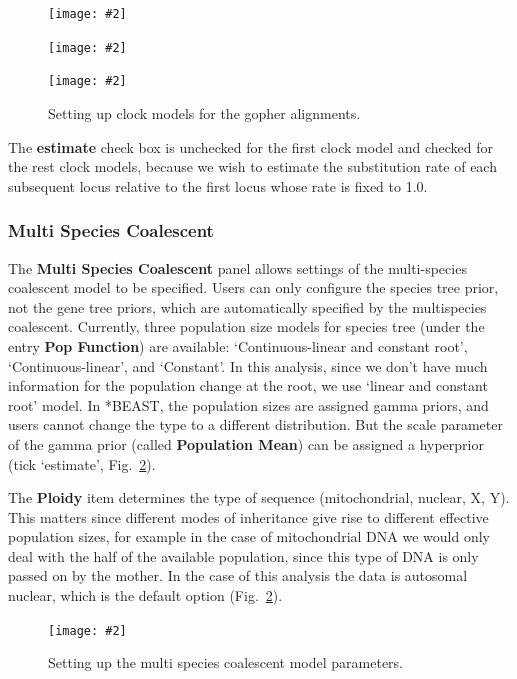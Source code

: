 \documentclass{article}
\newcommand{\includeimage}[2][]{%
\texttt{[image: \#2]}
}
\begin{document}
\begin{figure}[h]
\centering
\includeimage[scale=0.3,clip=true,trim=0 550 0 0]{figures/BEAUti_ClockModel1}
\centering
\includeimage[scale=0.3,clip=true,trim=0 550 0 0]{figures/BEAUti_ClockModel2}
\centering
\includeimage[scale=0.3,clip=true,trim=0 550 0 0]{figures/BEAUti_ClockModel3}
\caption{\label{fig.clockmodel} Setting up clock models for the gopher alignments.}
\end{figure}

The {\bf estimate} check box is unchecked for the first clock model and checked for the rest clock models, because we wish to estimate the substitution rate of each subsequent locus relative to the first locus whose rate is fixed to 1.0.

\subsubsection{Multi Species Coalescent}

The {\bf Multi Species Coalescent} panel allows settings of the multi-species coalescent model to be specified. Users can only configure the species tree prior, not the gene tree priors, which are automatically specified by the multispecies coalescent.
Currently, three population size models for species tree (under the entry {\bf Pop Function}) are available: `Continuous-linear and constant root', `Continuous-linear', and `Constant'. In this analysis, since we don't have much information for the population change at the root, we use `linear and constant root' model.
In *BEAST, the population sizes are assigned gamma priors, and users cannot change the type to a different distribution. But the scale parameter of the gamma prior (called {\bf Population Mean}) can be assigned a hyperprior (tick `estimate', Fig.~\ref{fig.MSP}).

The {\bf Ploidy} item determines the type of sequence (mitochondrial, nuclear, X, Y). This matters since different modes of inheritance give rise to different effective population sizes, for example in the case of mitochondrial DNA we would only deal with the half of the available population, since this type of DNA is only passed on by the mother. In the case of this analysis the data is autosomal nuclear, which is the default option (Fig.~\ref{fig.MSP}).

\begin{figure}[h]
\centering
\includeimage[scale=0.32,clip=true,trim=0 350 0 0]{figures/BEAUti_MSP}
\caption{\label{fig.MSP} Setting up the multi species coalescent model parameters.}
\end{figure}
\end{document}
